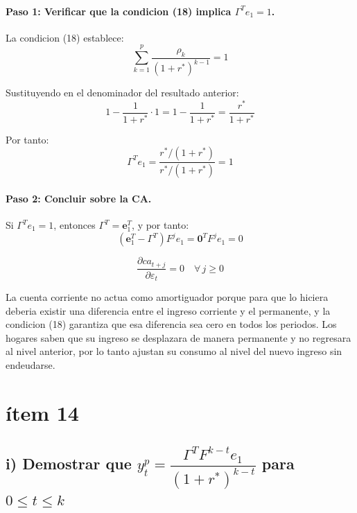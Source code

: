 \paragraph{Paso 1: Verificar que la condicion (18) implica $\Gamma^T e_1 = 1$.}

La condicion (18) establece:
\[
    \sum_{k=1}^{p} \frac{\rho_k}{(1+r^*)^{k-1}} = 1
\]

Sustituyendo en el denominador del resultado anterior:
\[
    1 - \frac{1}{1+r^*} \cdot 1 = 1 - \frac{1}{1+r^*} = \frac{r^*}{1+r^*}
\]

Por tanto:
\[
    \Gamma^T e_1 = \frac{r^*/(1+r^*)}{r^*/(1+r^*)} = 1
\]

\paragraph{Paso 2: Concluir sobre la CA.}

Si $\Gamma^T e_1 = 1$, entonces $\Gamma^T = \mathbf{e}_1^T$, y por tanto:
\[
    (\mathbf{e}_1^T - \Gamma^T) F^j e_1 = \mathbf{0}^T F^j e_1 = 0
\]

\begin{resultado}
\[
    \frac{\partial ca_{t+j}}{\partial \varepsilon_t} = 0 \quad \forall\, j \geq 0
\]
\end{resultado}

\begin{interpretacion}
La cuenta corriente no actua como amortiguador porque para que lo hiciera deberia existir una diferencia entre el ingreso corriente y el permanente, y la condicion (18) garantiza que esa diferencia sea cero en todos los periodos. Los hogares saben que su ingreso se desplazara de manera permanente y no regresara al nivel anterior, por lo tanto ajustan su consumo al nivel del nuevo ingreso sin endeudarse.
\end{interpretacion}

\section*{ítem 14}

\subsection*{i) Demostrar que $y_t^p = \dfrac{\Gamma^T F^{k-t} e_1}{(1+r^*)^{k-t}}$ para $0 \leq t \leq k$}

